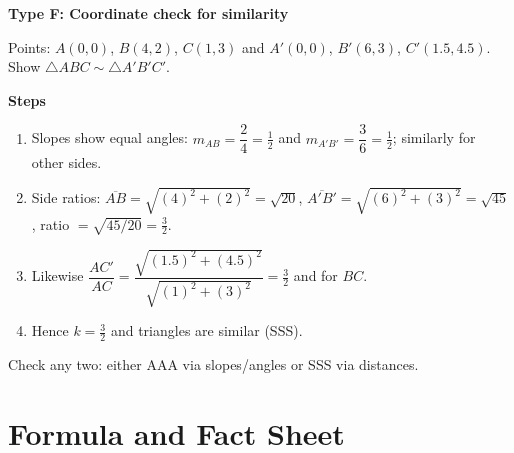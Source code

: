 \documentclass[11pt,a4paper]{article}
\begin{document}
\begin{examplebox}
\textbf{Type F: Coordinate check for similarity}

Points: $A(0,0)$, $B(4,2)$, $C(1,3)$ and $A'(0,0)$, $B'(6,3)$, $C'(1.5,4.5)$. Show $\triangle ABC\sim\triangle A'B'C'$.

\textbf{Steps}
\begin{enumerate}
  \item Slopes show equal angles: $m_{AB}=\dfrac{2}{4}=\tfrac{1}{2}$ and $m_{A'B'}=\dfrac{3}{6}=\tfrac{1}{2}$; similarly for other sides.
  \item Side ratios: $\overline{AB}=\sqrt{(4)^2+(2)^2}=\sqrt{20}$, $\overline{A'B'}=\sqrt{(6)^2+(3)^2}=\sqrt{45}$, ratio $=\sqrt{45/20}=\tfrac{3}{2}$.
  \item Likewise $\dfrac{AC'}{AC}=\dfrac{\sqrt{(1.5)^2+(4.5)^2}}{\sqrt{(1)^2+(3)^2}}=\tfrac{3}{2}$ and for $BC$.
  \item Hence $k=\tfrac{3}{2}$ and triangles are similar (SSS).
\end{enumerate}

\begin{shortcutbox}
Check any two: either AAA via slopes/angles or SSS via distances.
\end{shortcutbox}
\end{examplebox}

\newpage

\section*{Formula and Fact Sheet}
\end{document}
